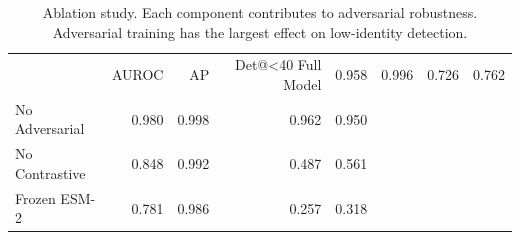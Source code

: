 \begin{table}
\caption{Ablation study. Each component contributes to adversarial robustness. Adversarial training has the largest effect on low-identity detection.}
\label{tab:ablation}
\begin{tabular}{lrrrr}
\toprule
 & AUROC & AP & Det@<40%
\midrule
Full Model & 0.958 & 0.996 & 0.726 & 0.762 \\
No Adversarial & 0.980 & 0.998 & 0.962 & 0.950 \\
No Contrastive & 0.848 & 0.992 & 0.487 & 0.561 \\
Frozen ESM-2 & 0.781 & 0.986 & 0.257 & 0.318 \\
\bottomrule
\end{tabular}
\end{table}
